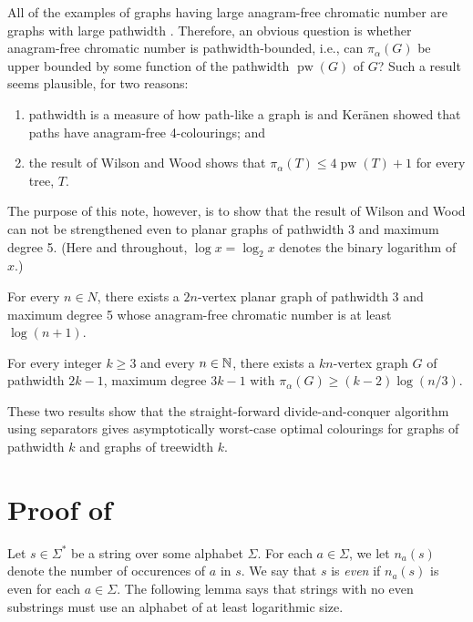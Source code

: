 \documentclass{patmorin}
\DeclareMathOperator{\pw}{pw}
\begin{document}
All of the examples of graphs having large anagram-free chromatic
number are graphs with large pathwidth \cite{robertson.seymour:graph}.
Therefore, an obvious question is whether anagram-free chromatic number
is pathwidth-bounded, i.e., can $\pi_\alpha(G)$ be upper bounded by some
function of the pathwidth $\pw(G)$ of $G$?  Such a result seems plausible,
for two reasons:
\begin{enumerate}
  \item pathwidth is a measure of how path-like a graph is and Ker\"anen
     showed that paths have anagram-free 4-colourings; and
  \item the result of Wilson and Wood \cite{wilson.wood:anagram-free}
     shows that $\pi_\alpha(T)\le 4\pw(T)+1$ for every tree, $T$.
\end{enumerate}
The purpose of this note, however, is to show that the result of Wilson
and Wood can not be strengthened even to planar graphs of pathwidth 3
and maximum degree 5. (Here and throughout, $\log x=\log_2 x$ denotes the binary logarithm of $x$.)

\begin{thm}
  For every $n\in N$, there exists a $2n$-vertex planar graph of
  pathwidth 3 and maximum degree 5 whose anagram-free chromatic number
  is at least $\log(n+1)$.
\end{thm}


\begin{thm}
  For every integer $k\ge 3$ and every $n\in\mathbb{N}$, there exists a
  $kn$-vertex graph $G$ of pathwidth $2k-1$, maximum degree $3k-1$
  with $\pi_\alpha(G)\ge (k-2)\log(n/3)$.
\end{thm}

These two results show that the straight-forward divide-and-conquer
algorithm using separators gives asymptotically worst-case optimal
colourings for graphs of pathwidth $k$ and graphs of treewidth $k$.

\section{Proof of }

Let $s\in\Sigma^*$ be a string over some alphabet $\Sigma$.  For each
$a\in\Sigma$, we let $n_a(s)$ denote the number of occurences of $a$
in $s$.  We say that $s$ is \emph{even} if $n_a(s)$ is even for each
$a\in\Sigma$.  The following lemma says that strings with no even
substrings must use an alphabet of at least logarithmic size.
\end{document}
